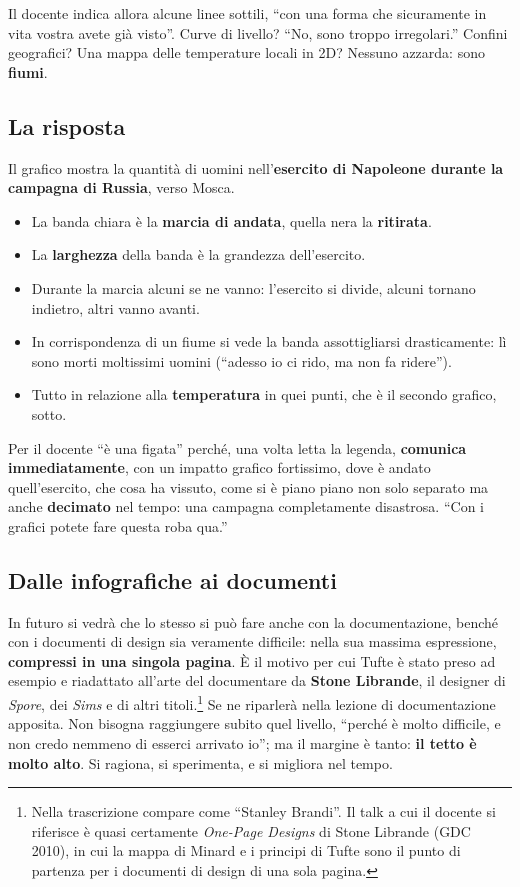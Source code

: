 Il docente indica allora alcune linee sottili, ``con una forma che
sicuramente in vita vostra avete già visto''. Curve di livello? ``No, sono
troppo irregolari.'' Confini geografici? Una mappa delle temperature locali in
2D? Nessuno azzarda: sono \textbf{fiumi}.

\subsection{La risposta}

Il grafico mostra la quantità di uomini nell'\textbf{esercito di Napoleone
durante la campagna di Russia}, verso Mosca.
\begin{itemize}
  \item La banda chiara è la \textbf{marcia di andata}, quella nera la
        \textbf{ritirata}.
  \item La \textbf{larghezza} della banda è la grandezza dell'esercito.
  \item Durante la marcia alcuni se ne vanno: l'esercito si divide, alcuni
        tornano indietro, altri vanno avanti.
  \item In corrispondenza di un fiume si vede la banda assottigliarsi
        drasticamente: lì sono morti moltissimi uomini (``adesso io ci
        rido, ma non fa ridere'').
  \item Tutto in relazione alla \textbf{temperatura} in quei punti, che è il
        secondo grafico, sotto.
\end{itemize}

Per il docente ``è una figata'' perché, una volta letta la legenda,
\textbf{comunica immediatamente}, con un impatto grafico fortissimo, dove è
andato quell'esercito, che cosa ha vissuto, come si è piano piano non solo
separato ma anche \textbf{decimato} nel tempo: una campagna completamente
disastrosa. ``Con i grafici potete fare questa roba qua.''

\subsection{Dalle infografiche ai documenti}

In futuro si vedrà che lo stesso si può fare anche con la documentazione,
benché con i documenti di design sia veramente difficile: nella sua massima
espressione, \textbf{compressi in una singola pagina}. È il motivo per cui
Tufte è stato preso ad esempio e riadattato all'arte del documentare da
\textbf{Stone Librande}, il designer di \emph{Spore}, dei \emph{Sims} e di
altri titoli.\footnote{Nella trascrizione compare come ``Stanley Brandi''.
Il talk a cui il docente si riferisce è quasi certamente \emph{One-Page
Designs} di Stone Librande (GDC 2010), in cui la mappa di Minard e i principi
di Tufte sono il punto di partenza per i documenti di design di una sola
pagina.} Se ne riparlerà nella lezione di documentazione apposita. Non bisogna
raggiungere subito quel livello, ``perché è molto difficile, e non credo
nemmeno di esserci arrivato io''; ma il margine è tanto: \textbf{il tetto è
molto alto}. Si ragiona, si sperimenta, e si migliora nel tempo.

